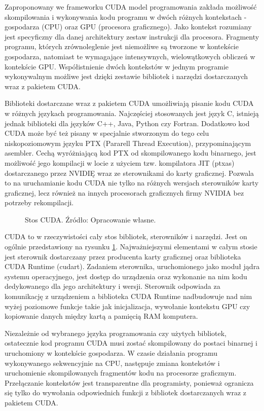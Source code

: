 Zaproponowany we frameworku CUDA model programowania zakłada możliwość
skompilowania i wykonywania kodu programu w dwóch różnych kontekstach -
gospodarza (CPU) oraz GPU (procesora graficznego)\cite{Nvi11b}. Jako kontekst rozumiany jest
specyficzny dla danej architektury zestaw instrukcji dla procesora. Fragmenty
programu, których zrównoleglenie jest niemożliwe są tworzone w kontekście
gospodarza,
	natomiast te wymagające intensywnych, wielowątkowych obliczeń w kontekście
	GPU.  Współistnienie dwóch kontekstów w jednym programie wykonywalnym
	możliwe jest dzięki zestawie bibliotek i narzędzi dostarczanych wraz z
	pakietem CUDA.

Biblioteki dostarczane wraz z pakietem CUDA umożliwiają pisanie kodu CUDA w różnych
językach programowania. Najczęściej stosowanych jest język C, istnieją jednak biblioteki
dla języków C++, Java, Python czy Fortran. Dodatkowo kod CUDA może być też pisany w specjalnie stworzonym do tego celu
niskopoziomowym języku PTX (Pararell Thread Execution), przypominającym asembler.
Cechą wyróżniającą kod PTX od skompilowanego kodu binarnego, jest możliwość jego
kompilacji w locie z użyciem tzw. kompilatora JIT (ptxas) dostarczanego przez
NVIDIĘ wraz ze sterownikami do karty graficznej. Pozwala to na uruchamianie kodu
CUDA nie tylko na różnych wersjach sterowników karty graficznej, lecz również na
innych procesorach graficznych firmy NVIDIA bez potrzeby rekompilacji.

\begin{figure}[ht]
\centering

\caption{Stos CUDA. Źródło: Opracowanie własne.}
\label{cuda-model}
\end{figure}

CUDA to w rzeczywistości cały stos bibliotek, sterowników i narzędzi. Jest on
ogólnie 
przedstawiony na rysunku \ref{cuda-model}. Najważniejszymi elementami w całym
stosie jest sterownik dostarczany przez producenta karty graficznej
oraz biblioteka CUDA Runtime (cudart). Zadaniem sterownika, uruchomionego
jako moduł jądra systemu operacyjnego, jest dostęp do urządzenia oraz wykonanie
na nim kodu dedykowanego dla jego architektury i wersji. Sterownik odpowiada za
komunikację z urządzeniem a biblioteka CUDA Runtime nadbudowuje nad nim wyżej
poziomowe funkcje takie jak inicjalizacja, wywołanie kontekstu GPU czy
kopiowanie danych między kartą a pamięcią RAM komputera.

Niezależnie od wybranego języka programowania czy użytych bibliotek, ostatecznie kod programu CUDA musi
zostać skompilowany do postaci binarnej i uruchomiony w kontekście gospodarza. W
czasie działania programu wykonywanego sekwencyjnie na CPU, następuje zmiana
kontekstów i uruchomienie skompilowanych fragmentów kodu na procesorze graficznym.
Przełączanie kontekstów jest transparentne dla programisty,
ponieważ ogranicza się tylko do wywołania odpowiednich funkcji z bibliotek
dostarczanych wraz z pakietem CUDA.

